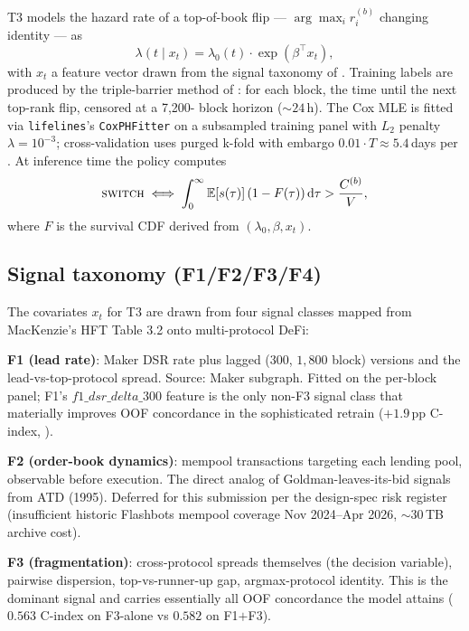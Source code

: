 T3 models the hazard rate of a top-of-book flip ---
$\arg\max_i r_i^{(b)}$ changing identity --- as
\begin{equation}
\label{eq:t3}
\lambda(t \mid x_t) = \lambda_0(t) \cdot \exp(\beta^{\top} x_t),
\end{equation}
with $x_t$ a feature vector drawn from the signal taxonomy of
.  Training labels are produced by the
triple-barrier method of \cite[Ch.\,3.6]{lopezdeprado2018}: for each
block, the time until the next top-rank flip, censored at a 7{,}200-
block horizon ($\sim 24$\,h).  The Cox MLE is fitted via
\texttt{lifelines}'s \texttt{CoxPHFitter} on a subsampled training
panel with $L_2$ penalty $\lambda = 10^{-3}$; cross-validation uses
purged k-fold with embargo $0.01 \cdot T \approx 5.4$\,days per
\cite[Ch.\,7]{lopezdeprado2018}.  At inference time the policy
computes
\begin{equation}
\label{eq:t3-decide}
\textsc{switch} \iff
  \int_0^{\infty} \mathbb{E}[s(\tau)]\,
                  (1 - F(\tau))\,\mathrm{d}\tau
  > \frac{C^{(b)}}{V},
\end{equation}
where $F$ is the survival CDF derived from
$(\lambda_0, \beta, x_t)$.

\subsection{Signal taxonomy (F1/F2/F3/F4)}
\label{sec:methodology-signals}

The covariates $x_t$ for T3 are drawn from four signal classes
mapped from MacKenzie's HFT Table 3.2 \cite{mackenzie2021} onto
multi-protocol DeFi:

\textbf{F1 (lead rate)}: Maker DSR rate plus lagged ($300$, $1{,}800$
block) versions and the lead-vs-top-protocol spread.  Source:
Maker subgraph.  Fitted on the per-block panel; F1's
$f1\_dsr\_delta\_300$ feature is the only non-F3 signal class that
materially improves OOF concordance in the sophisticated retrain
($+1.9$\,pp C-index, ).

\textbf{F2 (order-book dynamics)}: mempool transactions targeting
each lending pool, observable before execution.  The direct
analog of Goldman-leaves-its-bid signals from ATD (1995).
Deferred for this submission per the design-spec risk register
(insufficient historic Flashbots mempool coverage
Nov 2024--Apr 2026, $\sim 30$\,TB archive cost).

\textbf{F3 (fragmentation)}: cross-protocol spreads themselves
(the decision variable), pairwise dispersion, top-vs-runner-up
gap, argmax-protocol identity.  This is the dominant signal and
carries essentially all OOF concordance the model attains
($0.563$ C-index on F3-alone vs $0.582$ on F1$+$F3).

